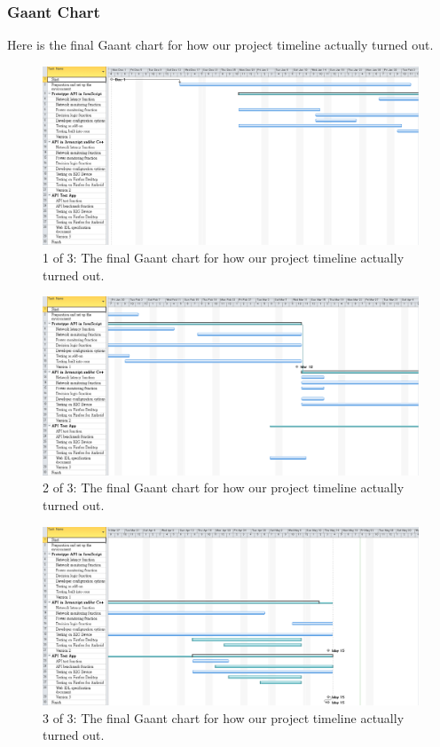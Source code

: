\documentclass[12pt]{article}
\begin{document}
\subsubsection{Gaant Chart}
Here is the final Gaant chart for how our project timeline actually turned out.

\begin{figure}[h!]
  \centering
	\includegraphics[scale=0.3]{finalgaant1.png}
  \caption{1 of 3: The final Gaant chart for how our project timeline actually turned out.}
\end{figure}
\begin{figure}[h!]
  \centering
	\includegraphics[scale=0.3]{finalgaant2.png}
  \caption{2 of 3: The final Gaant chart for how our project timeline actually turned out.}
\end{figure}
\pagebreak

\begin{figure}[h!]
  \centering
	\includegraphics[scale=0.3]{finalgaant3.png}
  \caption{3 of 3: The final Gaant chart for how our project timeline actually turned out.}
\end{figure}
\pagebreak
\end{document}
